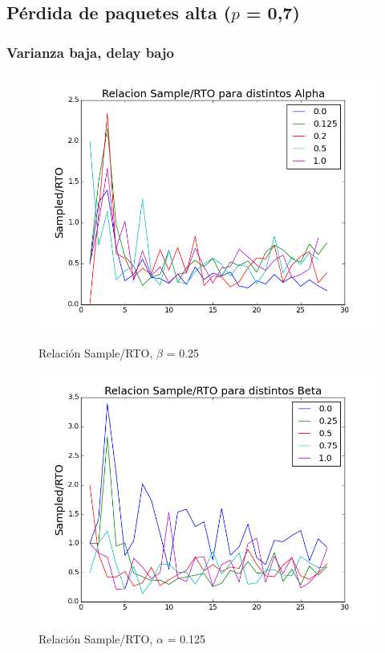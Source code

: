 \subsection{Pérdida de paquetes alta ($p$ = 0,7)}

\subsubsection{Varianza baja, delay bajo}

\begin{figure}[H]
\begin{minipage}{0.5\linewidth}
\includegraphics[width=\linewidth]{../graficos/alphad01var2drop50.png}
\caption{Relación Sample/RTO, $\beta$ = 0.25}\label{fig:alpha-var2-drop50}
\end{minipage}
\hfill
\begin{minipage}{0.5\linewidth}
\includegraphics[width=\linewidth]{../graficos/betad01var2drop50.png}
\caption{Relación Sample/RTO, $\alpha$ = 0.125}\label{fig:beta-var2-drop50}
\end{minipage}
\end{figure}

